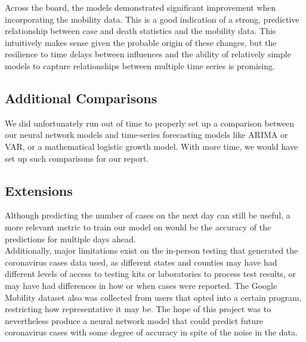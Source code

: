 ﻿\documentclass{article}
\begin{document}
\begin{multicols}{2}
Across the board, the models demonstrated significant improvement when
incorporating the mobility data.
This is a good indication of a strong, predictive relationship between case and
death statistics and the mobility data.
This intuitively makes sense given the probable origin of these changes,
but the resilience to time delays between influences and the ability of
relatively simple models to capture relationships between multiple time series
is promising. 

\subsection{Additional Comparisons}

We did unfortunately run out of time to properly set up a comparison between our
neural network models and time-series forecasting models like ARIMA or VAR, or a
mathematical logistic growth model. With more time, we would have set up such
comparisons for our report.

\subsection*{Extensions}

Although predicting the number of cases on the next day can still be useful, a
more relevant metric to train our model on would be the accuracy of the
predictions for multiple days ahead.\\
Additionally, major limitations exist on the in-person testing that generated
the coronavirus cases data used, as different states and counties may have had
different levels of access to testing kits or laboratories to process test
results, or may have had differences in how or when cases were reported. The
Google Mobility dataset also was collected from users that opted into a certain
program, restricting how representative it may be. The hope of this project was
to nevertheless produce a neural network model that could predict future
coronavirus cases with some degree of accuracy in spite of the noise in the
data.

\end{multicols}
\end{document}
